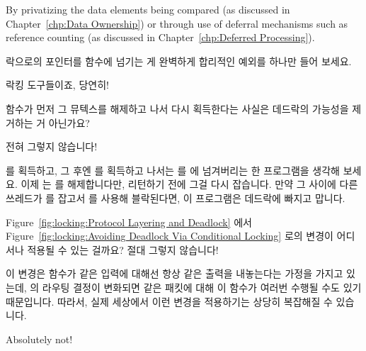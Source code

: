 \begin{enumerate}
	By privatizing the data elements being compared
	(as discussed in Chapter~\ref{chp:Data Ownership})
	or through use of deferral mechanisms such as
	reference counting (as discussed in
	Chapter~\ref{chp:Deferred Processing}).
	\fi

\QuickQ{}
	락으로의 포인터를 함수에 넘기는 게 완벽하게 합리적인 예외를 하나만 들어
	보세요.

\QuickA{}
	락킹 도구들이죠, 당연히!

\QuickQ{}
	 함수가 먼저 그 뮤텍스를 해제하고 나서 다시
	획득한다는 사실은 데드락의 가능성을 제거하는 거 아닌가요?

\QuickA{}
	전혀 그렇지 않습니다!

	 를 획득하고, 그 후엔  를 획득하고 나서는
	 를  에 넘겨버리는 한 프로그램을
	생각해 보세요.
	이제  는  를 해제합니다만, 리턴하기
	전에 그걸 다시 잡습니다.
	만약 그 사이에 다른 쓰레드가  를 잡고서  를
	사용해 블락된다면, 이 프로그램은 데드락에 빠지고 맙니다.

\QuickQ{}
	Figure~\ref{fig:locking:Protocol Layering and Deadlock} 에서
	Figure~\ref{fig:locking:Avoiding Deadlock Via Conditional Locking} 로의
	변경이 어디서나 적용될 수 있는 걸까요?
\QuickA{}
	절대 그렇지 않습니다!

	이 변경은  함수가 같은 입력에 대해선 항상 같은
	출력을 내놓는다는 가정을 가지고 있는데,  의 라우팅 결정이
	변화되면 같은 패킷에 대해 이 함수가 여러번 수행될 수도 있기 때문입니다.
	따라서, 실제 세상에서 이런 변경을 적용하기는 상당히 복잡해질 수
	있습니다.
	\iffalse

	Absolutely not!


\end{enumerate}
